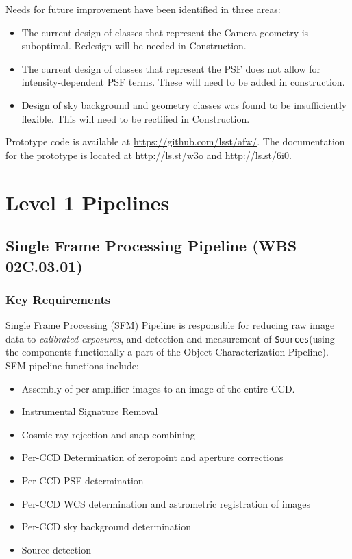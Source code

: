 \documentclass[12pt]{article}
\newcommand{\code}[1]{\texttt{#1}}
\newcommand{\Sources}{\code{Sources}\xspace}
\newcommand{\wbsSFM}{WBS 02C.03.01}
\begin{document}
Needs for future improvement have been identified in three areas:
\begin{itemize}
    \item The current design of classes that represent the Camera geometry is suboptimal. Redesign will be needed in Construction.
    \item The current design of classes that represent the PSF does not allow for intensity-dependent PSF terms. These will need to be added in construction.
    \item Design of sky background and geometry classes was found to be insufficiently flexible. This will need to be rectified in Construction.
\end{itemize}

Prototype code is available at \url{https://github.com/lsst/afw/}. The documentation for the prototype is located at \url{http://ls.st/w3o} and \url{http://ls.st/6i0}.

\clearpage

\section{Level 1 Pipelines}

\subsection{Single Frame Processing Pipeline (\wbsSFM)}

\subsubsection{Key Requirements}

Single Frame Processing (SFM) Pipeline is responsible for reducing raw image data to {\em calibrated exposures}, and detection and measurement of \Sources (using the components functionally a part of the Object Characterization Pipeline).
\\

SFM pipeline functions include:
%
\begin{itemize}
    \item Assembly of per-amplifier images to an image of the entire CCD.
    \item Instrumental Signature Removal
    \item Cosmic ray rejection and snap combining
    \item Per-CCD Determination of zeropoint and aperture corrections
    \item Per-CCD PSF determination
    \item Per-CCD WCS determination and astrometric registration of images
    \item Per-CCD sky background determination 
    \item Source detection
\end{itemize}
\end{document}

